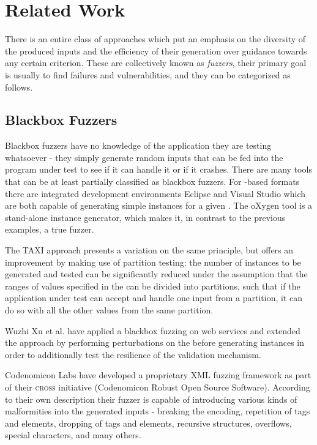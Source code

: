 \section{Related Work}
\label{sec:relwork}
There is an entire class of approaches which put an emphasis on the diversity of the produced inputs and the
efficiency of their generation over guidance towards any certain criterion. These are collectively known as
\emph{fuzzers}, their primary goal is usually to find failures and vulnerabilities, and they can be categorized
as follows.
\subsection{Blackbox Fuzzers}
Blackbox fuzzers have no knowledge of the application they are testing whatsoever - they simply generate random
inputs that can be fed into the program under test to see if it can handle it or if it crashes.
There are many tools that can be at least partially classified as blackbox fuzzers. For \xml-based formats
there are integrated development environments Eclipse\cite{eclipse} and Visual Studio\cite{visual} which are
both capable of generating simple instances for a given \xsd. The oXygen\cite{oxygen} tool is a stand-alone
\xml instance generator, which makes it, in contrast to the previous examples, a true fuzzer.
 		 
The TAXI\cite{Bertolino:2007:ATD:1270230.1270257} approach presents a variation on the same principle, but
offers an improvement by making use of partition testing: the number of instances to be generated
and tested can be significantly reduced under the assumption that the ranges of values specified in the \xsd
can be divided into partitions, such that if the application under test can accept and handle one input from a
partition, it can do so with all the other values from the same partition.

Wuzhi Xu et al.\cite{1544740} have applied a blackbox fuzzing on web services and extended the approach by
performing perturbations on the \xsd before generating instances in order to additionally test the resilience
of the validation mechanism.

Codenomicon Labs have developed a proprietary XML fuzzing framework\cite{codenomicon} as part of their
\textsc{cross} initiative (Codenomicon Robust Open Source Software). According to their own description their
fuzzer is capable of introducing various kinds of malformities into the generated inputs - breaking the
encoding, repetition of tags and elements, dropping of tags and elements, recursive structures, overflows,
special characters, and many others.

